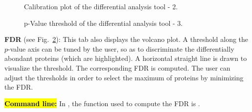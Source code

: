 \documentclass[12pt]{article}
\begin{document}
\begin {figure}
\centering
{}
\caption{Calibration plot of the differential analysis tool - 2.}
\label{fig:anadiff2}
\end {figure}


\begin {figure}
\centering
{}
\caption{p-Value threshold of the differential analysis tool - 3.}
\label{fig:anadiff3}
\end {figure}

\textbf{FDR} (see Fig.~\ref{fig:anadiff3}): This tab also displays the 
volcano plot. A threshold along the $p$-value axis can be tuned by the user, 
so as to discriminate the differentially abondant proteins (which are 
highlighted). A horizontal straight line is drawn to visualize the threshold. 
The corresponding FDR is computed. The user can adjust the thresholds in 
order to select the maximum of proteins by minimizing the FDR.


\hl{\bf Command line:} In , the function used to compute the 
FDR is .
\end{document}
